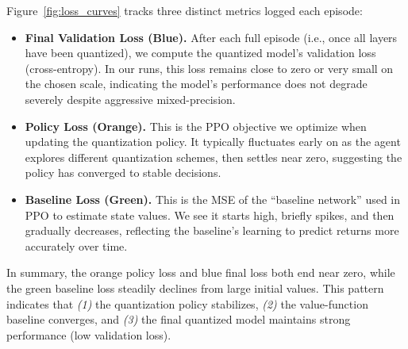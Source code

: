 \documentclass{article}
\begin{document}
	Figure~\ref{fig:loss_curves} tracks three distinct metrics logged each episode:
	\begin{itemize}
		\item \textbf{Final Validation Loss (Blue).} 
		After each full episode (i.e., once all layers have been quantized), we compute the quantized model's validation loss (cross-entropy). 
		In our runs, this loss remains close to zero or very small on the chosen scale, indicating the model’s performance does not degrade severely despite aggressive mixed-precision.
		
		\item \textbf{Policy Loss (Orange).} 
		This is the PPO objective we optimize when updating the quantization policy. 
		It typically fluctuates early on as the agent explores different quantization schemes, then settles near zero, suggesting the policy has converged to stable decisions.
		
		\item \textbf{Baseline Loss (Green).}		
		This is the MSE of the “baseline network” used in PPO to estimate state values. 
		We see it starts high, briefly spikes, and then gradually decreases, reflecting the baseline’s learning to predict returns more accurately over time.
	\end{itemize}
	
	In summary, the orange policy loss and blue final loss both end near zero, while the green baseline loss steadily declines from large initial values. 
	This pattern indicates that \emph{(1)} the quantization policy stabilizes, \emph{(2)} the value-function baseline converges, and \emph{(3)} the final quantized model maintains strong performance (low validation loss). 
		
\end{document}
